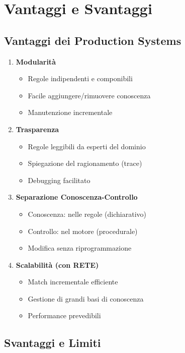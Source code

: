 \section{Vantaggi e Svantaggi}

\subsection{Vantaggi dei Production Systems}

\begin{enumerate}
\item \textbf{Modularità}
\begin{itemize}
\item Regole indipendenti e componibili
\item Facile aggiungere/rimuovere conoscenza
\item Manutenzione incrementale
\end{itemize}

\item \textbf{Trasparenza}
\begin{itemize}
\item Regole leggibili da esperti del dominio
\item Spiegazione del ragionamento (trace)
\item Debugging facilitato
\end{itemize}

\item \textbf{Separazione Conoscenza-Controllo}
\begin{itemize}
\item Conoscenza: nelle regole (dichiarativo)
\item Controllo: nel motore (procedurale)
\item Modifica senza riprogrammazione
\end{itemize}

\item \textbf{Scalabilità (con RETE)}
\begin{itemize}
\item Match incrementale efficiente
\item Gestione di grandi basi di conoscenza
\item Performance prevedibili
\end{itemize}
\end{enumerate}

\subsection{Svantaggi e Limiti}

